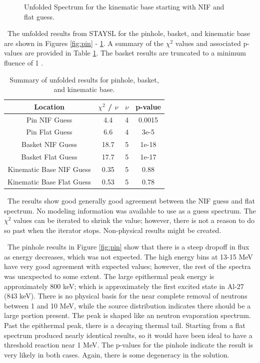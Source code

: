 \documentclass[journal]{IEEEtran}
\let\MYoriglatexcaption\caption
\renewcommand{\caption}[2][\relax]{\MYoriglatexcaption[#2]{#2}}
\begin{document}
\begin{figure}[t!]
		\caption{Unfolded Spectrum for the kinematic base starting with NIF and flat guess.}
		\label{fig:kbas}
		
	\end{figure}
	\ The unfolded results from STAYSL for the pinhole, basket, and kinematic base are shown in Figures \ref{fig:pin} - \ref{fig:kbas}. 
A summary of the $\chi^{2}$ values and associated p-values are provided in Table \ref{Table:STAY}. 
The basket results are truncated to a minimum fluence of 1 . 
	
	\begin{table}[h]
		\caption{Summary of unfolded results for pinhole, basket, and kinematic base.}
		\label{Table:STAY}
		\centering
		\begin{tabular}{|c|c|c|c|}
			\hline
			Location & $\chi^{2}$ / $\nu$ & $\nu$ & p-value \\ \hline
			Pin NIF Guess & 4.4 & 4 & 0.0015 \\ \hline
			Pin Flat Guess & 6.6 & 4 & 3e-5 \\ \hline
			Basket NIF Guess & 18.7 & 5 & 1e-18 \\ \hline
			Basket Flat Guess & 17.7 & 5 & 1e-17 \\ \hline
			Kinematic Base NIF Guess & 0.35 & 5 & 0.88 \\ \hline
			Kinematic Base Flat Guess & 0.53 & 5 & 0.78 \\ \hline
		\end{tabular}
	\end{table}
	
	\ The results show good generally good agreement between the NIF guess and flat spectrum. 
No modeling information was available to use as a guess spectrum. 
The $\chi^{2}$ values can be iterated to shrink the value; however, there is not a reason to do so past when the iterator stops.
Non-physical results might be created. 
	
	\ The pinhole results in Figure \ref{fig:pin} show that there is a steep dropoff in flux as energy decreases, which was not expected. 
The high energy bins at 13-15 MeV have very good agreement with expected values; however, the rest of the spectra was unexpected to some extent. 
The large epithermal peak energy is approximately 800 keV; which is approximately the first excited state in Al-27 (843 keV). 
There is no physical basis for the near complete removal of neutrons between 1 and 10 MeV, while the source distribution indicates there should be a large portion present. 
The peak is shaped like an neutron evaporation spectrum. Past the epithermal peak, there is a decaying thermal tail. 
Starting from a flat spectrum produced nearly identical results, so it would have been ideal to have a threshold reaction near 1 MeV. 
The p-values for the pinhole indicate the result is very likely in both cases. 
Again, there is some degeneracy in the solution. 
	
\end{document}

